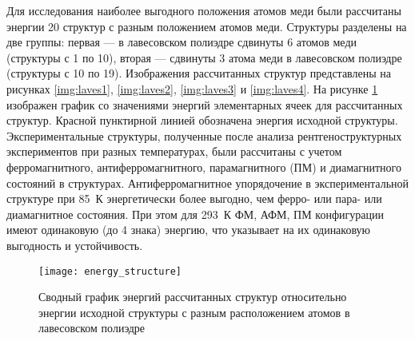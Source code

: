 Для исследования наиболее выгодного положения атомов меди были рассчитаны энергии 20 структур с разным положением атомов меди.
Структуры разделены на две группы: первая --- в лавесовском полиэдре сдвинуты 6 атомов меди (структуры с 1 по 10), вторая --- сдвинуты 3 атома меди в лавесовском полиэдре (структуры с 10 по 19). Изображения рассчитанных структур представлены на рисунках \ref{img:laves1}, \ref{img:laves2}, \ref{img:laves3} и \ref{img:laves4}.
На рисунке \ref{img:th} изображен график со значениями энергий элементарных ячеек для рассчитанных структур. Красной пунктирной линией обозначена энергия исходной структуры.
Экспериментальные структуры, полученные после анализа рентгеноструктурных экспериментов при разных температурах, были рассчитаны с учетом ферромагнитного, антиферромагнитного, парамагнитного (ПМ) и диамагнитного состояний в структурах.
Антиферромагнитное упорядочение в экспериментальной структуре при 85~К энергетически более выгодно, чем ферро- или пара- или диамагнитное состояния. При этом для 293~К ФМ, АФМ, ПМ конфигурации имеют одинаковую (до 4 знака) энергию, что указывает на их одинаковую выгодность и устойчивость.

\begin{figure}[ht!]
  \begin{minipage}[ht]{0.9\linewidth}\centering
    \texttt{[image: energy\_structure]}
  \end{minipage}

      \caption[Сводный график энергий рассчитанных структур относительно энергии исходной структуры с разным расположением атомов в лавесовском полиэдре]{Сводный график энергий рассчитанных структур относительно энергии исходной структуры с разным расположением атомов в лавесовском полиэдре}
    \label{img:th}
\end{figure}

